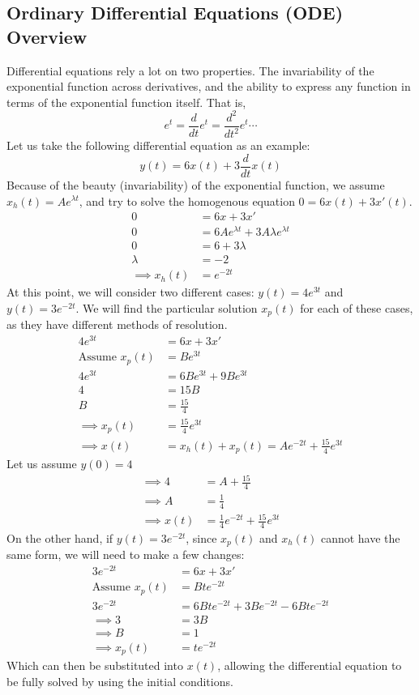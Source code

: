 \documentclass[nobib]{tufte-handout}
\begin{document}
\subsection{Ordinary Differential Equations (ODE) Overview}
Differential equations rely a lot on two properties. The invariability of the exponential function across derivatives, and the ability to express any function in terms of the exponential function itself. That is,\\
\begin{equation*}
    e^t=\frac{d}{dt}e^t=\frac{d^2}{dt^2}e^t \cdots
\end{equation*}
Let us take the following differential equation as an example:
\begin{equation*}
    y(t)=6x(t)+3\frac{d}{dt}x(t)
\end{equation*}
Because of the beauty (invariability) of the exponential function, we assume $x_h(t)=Ae^{\lambda t}$, and try to solve the homogenous equation $0=6x(t)+3x'(t)$.
\begin{align*}
    0 &= 6x+3x'\\
    0 &= 6Ae^{\lambda t} + 3A \lambda e^{\lambda t}\\
    0 &= 6+3\lambda\\
    \lambda &= -2\\
    \implies x_h(t) &= e^{-2t}
\end{align*}
At this point, we will consider two different cases: $y(t) = 4e^{3t}$ and $y(t) = 3e^{-2t}$.
We will find the particular solution $x_p(t)$ for each of these cases, as they have different methods of resolution.
\begin{align*}
    4e^{3t} &= 6x+3x'\\
    \text{Assume } x_p(t) &= Be^{3t}\\
    4e^{3t} &= 6Be^{3t} + 9Be^{3t}\\
    4 &= 15B\\
    B &= \frac{15}{4}\\
    \implies x_p(t) &= \frac{15}{4}e^{3t}\\
    \implies x(t) &= x_h(t)+x_p(t)=Ae^{-2t}+\frac{15}{4}e^{3t}
\end{align*}
Let us assume $y(0) = 4$
\begin{align*}
    \implies 4 &= A + \frac{15}{4}\\
    \implies A &= \frac{1}{4}\\
    \implies x(t) &= \frac{1}{4}e^{-2t}+\frac{15}{4}e^{3t}
\end{align*}
On the other hand, if $y(t) = 3e^{-2t}$, since $x_p(t)$ and $x_h(t)$ cannot have the same form, we will need to make a few changes:
\begin{align*}
    3e^{-2t} &= 6x+3x'\\
    \text{Assume } x_p(t) &= Bte^{-2t}\\
    3e^{-2t} &= 6Bte^{-2t} + 3Be^{-2t} - 6Bte^{-2t}\\
    \implies 3 &= 3B\\
    \implies B&=1\\
    \implies x_p(t) &= te^{-2t}
\end{align*}
Which can then be substituted into $x(t)$, allowing the differential equation to be fully solved by using the initial conditions.
\end{document}
